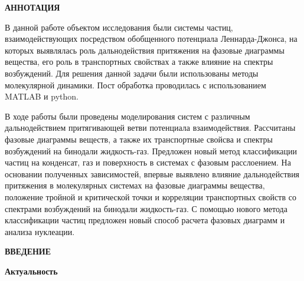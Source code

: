 
\newpage
\begin{center}
\textbf{АННОТАЦИЯ}
\end{center}

В данной работе объектом исследования были системы частиц, взаимодействующих посредством обобщенного потенциала Леннарда-Джонса, на которых выявлялась роль дальнодействия притяжения на фазовые диаграммы вещества, его роль в транспортных свойствах а также влияние на спектры возбуждений. Для решения данной задачи были использованы методы молекулярной динамики. Пост обработка проводилась с использованием MATLAB и python.

В ходе работы были проведены моделирования систем с различным дальнодействием притягивающей ветви потенциала взаимодействия.
Рассчитаны фазовые диаграммы веществ, а также их транспортные свойсва и спектры возбуждений на бинодали жидкость-газ.
Предложен новый метод классификации частиц на конденсат, газ и поверхность в системах с фазовым расслоением.
На основании полученных зависимостей, впервые выявлено влияние дальнодействия притяжения в молекулярных системах на фазовые диаграммы вещества, положение тройной и критической точки и корреляции транспортных свойств со спектрами возбуждений на бинодали жидкость-газ.
С помощью нового метода классификации частиц предложен новый способ расчета фазовых диаграмм и анализа нуклеации.



\onehalfspacing
\setcounter{page}{2}
\renewcommand{\contentsname}{\centerline{\Large{Cодержание}}}
\tableofcontents
{}
\renewcommand{\contentsname}{\centerline{\Large{Cодержание}}}

\newpage
\begin{center}
\textbf{ВВЕДЕНИЕ}
\end{center}



\textbf{Актуальность}

